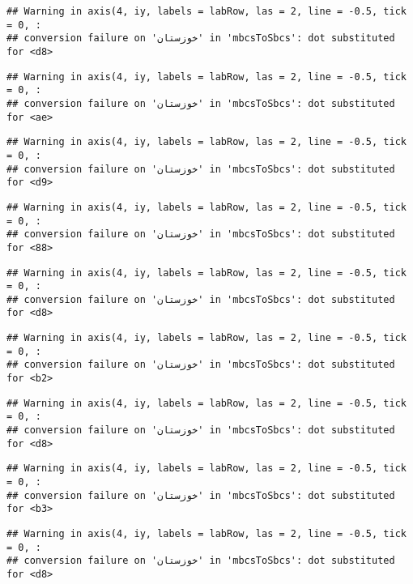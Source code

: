 \documentclass[
]{article}
\begin{document}
\begin{verbatim}
## Warning in axis(4, iy, labels = labRow, las = 2, line = -0.5, tick = 0, :
## conversion failure on 'خوزستان' in 'mbcsToSbcs': dot substituted for <d8>
\end{verbatim}

\begin{verbatim}
## Warning in axis(4, iy, labels = labRow, las = 2, line = -0.5, tick = 0, :
## conversion failure on 'خوزستان' in 'mbcsToSbcs': dot substituted for <ae>
\end{verbatim}

\begin{verbatim}
## Warning in axis(4, iy, labels = labRow, las = 2, line = -0.5, tick = 0, :
## conversion failure on 'خوزستان' in 'mbcsToSbcs': dot substituted for <d9>
\end{verbatim}

\begin{verbatim}
## Warning in axis(4, iy, labels = labRow, las = 2, line = -0.5, tick = 0, :
## conversion failure on 'خوزستان' in 'mbcsToSbcs': dot substituted for <88>
\end{verbatim}

\begin{verbatim}
## Warning in axis(4, iy, labels = labRow, las = 2, line = -0.5, tick = 0, :
## conversion failure on 'خوزستان' in 'mbcsToSbcs': dot substituted for <d8>
\end{verbatim}

\begin{verbatim}
## Warning in axis(4, iy, labels = labRow, las = 2, line = -0.5, tick = 0, :
## conversion failure on 'خوزستان' in 'mbcsToSbcs': dot substituted for <b2>
\end{verbatim}

\begin{verbatim}
## Warning in axis(4, iy, labels = labRow, las = 2, line = -0.5, tick = 0, :
## conversion failure on 'خوزستان' in 'mbcsToSbcs': dot substituted for <d8>
\end{verbatim}

\begin{verbatim}
## Warning in axis(4, iy, labels = labRow, las = 2, line = -0.5, tick = 0, :
## conversion failure on 'خوزستان' in 'mbcsToSbcs': dot substituted for <b3>
\end{verbatim}

\begin{verbatim}
## Warning in axis(4, iy, labels = labRow, las = 2, line = -0.5, tick = 0, :
## conversion failure on 'خوزستان' in 'mbcsToSbcs': dot substituted for <d8>
\end{verbatim}
\end{document}
